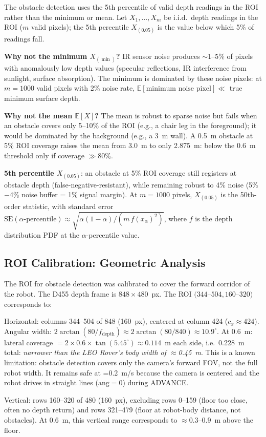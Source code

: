 The obstacle detection uses the 5th percentile of valid depth readings in the ROI rather than the minimum or mean. Let $X_1,\dots,X_m$ be i.i.d.\ depth readings in the ROI ($m$ valid pixels); the 5th percentile $X_{(0.05)}$ is the value below which 5\% of readings fall.

\textbf{Why not the minimum $X_{(\min)}$?} IR sensor noise produces $\sim$1--5\% of pixels with anomalously low depth values (specular reflections, IR interference from sunlight, surface absorption). The minimum is dominated by these noise pixels: at $m=1000$ valid pixels with 2\% noise rate, $\mathbb{E}[\text{minimum noise pixel}] \ll$ true minimum surface depth.

\textbf{Why not the mean $\mathbb{E}[X]$?} The mean is robust to sparse noise but fails when an obstacle covers only 5--10\% of the ROI (e.g., a chair leg in the foreground); it would be dominated by the background (e.g., a 3~m wall). A 0.5~m obstacle at 5\% ROI coverage raises the mean from 3.0~m to only 2.875~m: below the 0.6~m threshold only if coverage $\gg80\%$.

\textbf{5th percentile $X_{(0.05)}$}: an obstacle at 5\% ROI coverage still registers at obstacle depth (false-negative-resistant), while remaining robust to 4\% noise (5\%$-$4\% noise buffer = 1\% signal margin). At $m=1000$ pixels, $X_{(0.05)}$ is the 50th-order statistic, with standard error $\text{SE}(\alpha\text{-percentile}) \approx \sqrt{\alpha(1-\alpha)/(m\,f(x_\alpha)^2)}$, where $f$ is the depth distribution PDF at the $\alpha$-percentile value.

\subsection{ROI Calibration: Geometric Analysis}

The ROI for obstacle detection was calibrated to cover the forward corridor of the robot. The D455 depth frame is $848\times480$~px. The ROI $(344$--$504, 160$--$320)$ corresponds to:

\begin{eqblock}
Horizontal: columns 344--504 of 848 (160~px), centered at column 424 ($c_x\approx424$). Angular width: $2\arctan(80/f_{\text{depth}}) \approx 2\arctan(80/840) \approx 10.9^\circ$. At 0.6~m: lateral coverage $= 2\times0.6\times\tan(5.45^\circ) \approx 0.114$~m each side, i.e.\ 0.228~m total: \emph{narrower than the LEO Rover's body width of $\approx$0.45~m}. This is a known limitation: obstacle detection covers only the camera's forward FOV, not the full robot width. It remains safe at =0.2~m/s because the camera is centered and the robot drives in straight lines ($\text{ang}=0$) during ADVANCE.

Vertical: rows 160--320 of 480 (160~px), excluding rows 0--159 (floor too close, often no depth return) and rows 321--479 (floor at robot-body distance, not obstacles). At 0.6~m, this vertical range corresponds to $\approx$0.3--0.9~m above the floor.
\end{eqblock}

